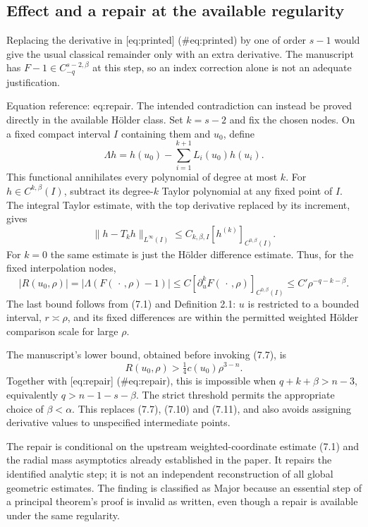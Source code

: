 \documentclass[10pt]{article}
\begin{document}
\subsection*{Effect and a repair at the available regularity}
Replacing the derivative in [eq:printed] (\#eq:printed) by one of order \(s-1\) would give the usual classical remainder only with an extra derivative. The manuscript has \(F-1\in C^{s-2,\beta}_{-q}\) at this step, so an index correction alone is not an adequate justification.\par
Equation reference: eq:repair. The intended contradiction can instead be proved directly in the available Hölder class. Set \(k=s-2\) and fix the chosen nodes. On a fixed compact interval \(I\) containing them and \(u_0\), define \[\Lambda h=h(u_0)-\sum_{i=1}^{k+1}L_i(u_0)h(u_i).\] This functional annihilates every polynomial of degree at most \(k\). For \(h\in C^{k,\beta}(I)\), subtract its degree-\(k\) Taylor polynomial at any fixed point of \(I\). The integral Taylor estimate, with the top derivative replaced by its increment, gives \[\|h-T_kh\|_{L^\infty(I)}
       \leq C_{k,\beta,I}[h^{(k)}]_{C^{0,\beta}(I)}.\] For \(k=0\) the same estimate is just the Hölder difference estimate. Thus, for the fixed interpolation nodes, \[
 |R(u_0,\rho)|=|\Lambda(F(\,\cdot\,,\rho)-1)|
 \leq C[\partial_u^k F(\,\cdot\,,\rho)]_{C^{0,\beta}(I)}
 \leq C'\rho^{-q-k-\beta}.\] The last bound follows from (7.1) and Definition 2.1: \(u\) is restricted to a bounded interval, \(r\asymp\rho\), and its fixed differences are within the permitted weighted Hölder comparison scale for large \(\rho\).\par
The manuscript’s lower bound, obtained before invoking (7.7), is \[R(u_0,\rho)>\tfrac14c(u_0)\rho^{3-n}.\] Together with [eq:repair] (\#eq:repair), this is impossible when \(q+k+\beta>n-3\), equivalently \(q>n-1-s-\beta\). The strict threshold permits the appropriate choice of \(\beta<\alpha\). This replaces (7.7), (7.10) and (7.11), and also avoids assigning derivative values to unspecified intermediate points.\par
The repair is conditional on the upstream weighted-coordinate estimate (7.1) and the radial mass asymptotics already established in the paper. It repairs the identified analytic step; it is not an independent reconstruction of all global geometric estimates. The finding is classified as Major because an essential step of a principal theorem’s proof is invalid as written, even though a repair is available under the same regularity.\par
\end{document}
